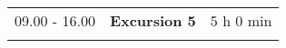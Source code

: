 \begin{longtable}{p{3cm}p{10cm}p{4cm}}
\vspace{1cm}
09.00 - 16.00 & {\bf Excursion 5} & \hfill 5 h 0 min\\ 
\vspace{1cm}
\end{longtable}

